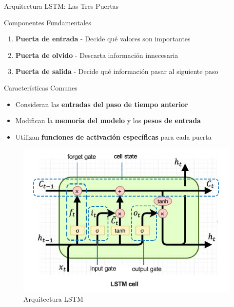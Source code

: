 \documentclass[
  ignorenonframetext,
]{beamer}
\providecommand{\tightlist}{%
  \setlength{\itemsep}{0pt}\setlength{\parskip}{0pt}}
\begin{document}
\begin{frame}{Arquitectura LSTM: Las Tres Puertas}
\label{arquitectura-lstm-las-tres-puertas}
\begin{block}{Componentes Fundamentales}
\label{componentes-fundamentales}
\begin{enumerate}
\tightlist
\item
  \textbf{Puerta de entrada} - Decide qué valores son importantes
\item
  \textbf{Puerta de olvido} - Descarta información innecesaria\\
\item
  \textbf{Puerta de salida} - Decide qué información pasar al siguiente
  paso
\end{enumerate}
\end{block}

\begin{block}{Características Comunes}
\label{caracteruxedsticas-comunes}
\begin{itemize}
\tightlist
\item
  Consideran las \textbf{entradas del paso de tiempo anterior}
\item
  Modifican la \textbf{memoria del modelo} y los \textbf{pesos de
  entrada}
\item
  Utilizan \textbf{funciones de activación específicas} para cada puerta
\end{itemize}

\begin{figure}[H]

{\centering \includegraphics[width=0.5\linewidth,height=\textheight,keepaspectratio]{LSTM.png}

}

\caption{Arquitectura LSTM}

\end{figure}%
\end{block}
\end{frame}
\end{document}
